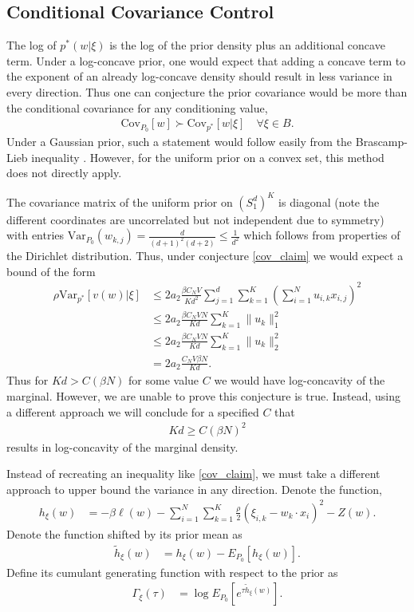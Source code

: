 \documentclass{article}
\numberwithin{equation}{section}
\theoremstyle{Lemma}
\theoremstyle{Corollary}
\theoremstyle{Theorem}
\theoremstyle{Remark}
\begin{document}
\subsection{Conditional Covariance Control}
The log of $p^{*}(w|\xi)$ is the log of the prior density plus an additional concave term. Under a log-concave prior, one would expect that adding a concave term to the exponent of an already log-concave density should result in less variance in every direction. Thus one can conjecture the prior covariance would be more than the conditional covariance for any conditioning value,
\begin{align}
    \text{Cov}_{P_{0}}[w] \succ \text{Cov}_{p^{*}}[w|\xi]\quad \forall \xi \in B. \label{cov_claim}
\end{align}
Under a Gaussian prior, such a statement would follow easily from the Brascamp-Lieb inequality \cite[Proposition 2.1]{bobkov2000brunn}. However, for the uniform prior on a convex set, this method does not directly apply.

The covariance matrix of the uniform prior on $(S^{d}_{1})^{K}$ is diagonal (note the different coordinates are uncorrelated but not independent due to symmetry) with entries $\text{Var}_{P_{0}}(w_{k,j}) = \frac{d}{(d+1)^{2}(d+2)} \leq \frac{1}{d^{2}}$ which follows from properties of the Dirichlet distribution. Thus, under conjecture \eqref{cov_claim} we would expect a bound of the form
\begin{align}
    \rho \text{Var}_{p^{*}}[v(w)|\xi]& \leq 2a_{2}\frac{\beta C_{N}V}{K d^{2}}\sum_{j=1}^{d}\sum_{k=1}^{K}(\sum_{i=1}^{N}u_{i,k}x_{i,j})^{2}\\
    & \leq 2a_{2}\frac{\beta C_{N}V N}{K d}\sum_{k=1}^{K}\|u_{k}\|_{1}^{2}\\
    & \leq 2a_{2}\frac{\beta  C_{N}V N}{Kd}\sum_{k=1}^{K}\|u_{k}\|_{2}^{2}\\
    &=  2a_{2}\frac{C_{N}V \beta N}{Kd}.
\end{align}
Thus for $Kd > C(\beta N)$ for some value $C$ we would have log-concavity of the marginal. However, we are unable to prove this conjecture is true. Instead, using a different approach we will conclude for a specified $C$ that
\begin{align}
    Kd\geq C(\beta N)^{2}
\end{align}
results in log-concavity of the marginal density.


Instead of recreating an inequality like \eqref{cov_claim}, we must take a different approach to upper bound the variance in any direction. Denote the function,
    \begin{align}
        h_{\xi}(w)&=-\beta \ell(w)-\sum_{i=1}^{N}\sum_{k=1}^{K}\frac{\rho}{2}(\xi_{i,k}-w_{k}\cdot x_{i})^{2}-Z(w).
    \end{align}
    Denote the function shifted by its prior mean as
    \begin{align}
        \tilde{h}_{\xi}(w)&=h_{\xi}(w)-E_{P_{0}}[h_{\xi}(w)].
    \end{align}
    Define its cumulant generating function with respect to the prior as
    \begin{align}
    \Gamma_{\xi}(\tau)&=\log E_{P_{0}}[e^{\tau \tilde{h}_{\xi}(w)}].\label{Gamma_def}   
    \end{align}
\end{document}
